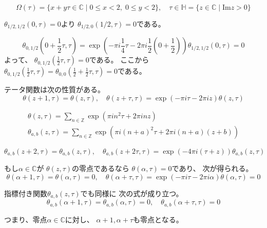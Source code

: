 \documentclass[12pt,b5paper]{ltjsarticle}
\begin{document}
\begin{description}
\begin{description}
\dotfill

\begin{equation}
 \Omega(\tau) = \{ x+y\tau \in\mathbb{C} \mid 0\leq x <2,\; 0\leq y <2 \}
  ,\quad
  \tau\in\mathbb{H}=\{ z\in\mathbb{C} \mid \mathrm{Im} z >0\}
\end{equation}


$\theta_{1/2,1/2}(0,\tau)=0$より
$\theta_{1/2,0}(1/2,\tau)=0$である。

\begin{equation}
 \theta_{0,1/2}(0+\frac{1}{2}\tau,\tau)
  = \exp{(-\pi i\frac{1}{4}\tau-2\pi i\frac{1}{2}(0+\frac{1}{2}))}
  \theta_{1/2,1/2}(0,\tau) =0
\end{equation}
よって、
$\theta_{0,1/2}(\frac{1}{2}\tau,\tau)=0$である。
ここから
$\theta_{0,1/2}(\frac{1}{2}\tau,\tau)=\theta_{0,0}(\frac{1}{2}+\frac{1}{2}\tau,\tau)=0$である。


テータ関数は次の性質がある。
\begin{equation}
 \theta(z+1,\tau) = \theta(z,\tau)
  ,\quad
  \theta(z+\tau,\tau) =
  \exp{(-\pi i\tau -2\pi iz)}\theta(z,\tau)
\end{equation}


\begin{gather}
 \theta(z,\tau) = \sum_{n\in\mathbb{Z}} \exp{(\pi i n^{2}\tau + 2\pi i nz)}\\
 \theta_{a,b}(z,\tau)
  = \sum_{n\in\mathbb{Z}}\exp{(\pi i(n+a)^{2}\tau + 2\pi i(n+a)(z+b))}
\end{gather}

\begin{equation}
 \theta_{a,b}(z+2,\tau) = \theta_{a,b}(z,\tau)
  ,\quad
 \theta_{a,b}(z+2\tau,\tau) = \exp{(-4\pi i(\tau+z))} \theta_{a,b}(z,\tau)
\end{equation}


もし$\alpha\in\mathbb{C}$が
$\theta(z,\tau)$の零点であるなら
$\theta(\alpha,\tau)=0$であり、
次が得られる。
\begin{equation}
 \theta(\alpha+1,\tau)=\theta(\alpha,\tau)=0
  ,\quad
 \theta(\alpha+\tau,\tau)
=
\exp{(-\pi i\tau -2\pi i\alpha)}
\theta(\alpha,\tau)=0
\end{equation}

指標付き関数$\theta_{a,b}(z,\tau)$でも同様に
次の式が成り立つ。
\begin{equation}
 \theta_{a,b}(\alpha+1,\tau)=\theta_{a,b}(\alpha,\tau)=0
  ,\quad
 \theta_{a,b}(\alpha+\tau,\tau)=0
\end{equation}

つまり、零点$\alpha\in\mathbb{C}$に対し、
$\alpha+1,\alpha+\tau$も零点となる。



\end{description}
\end{description}
\end{document}
